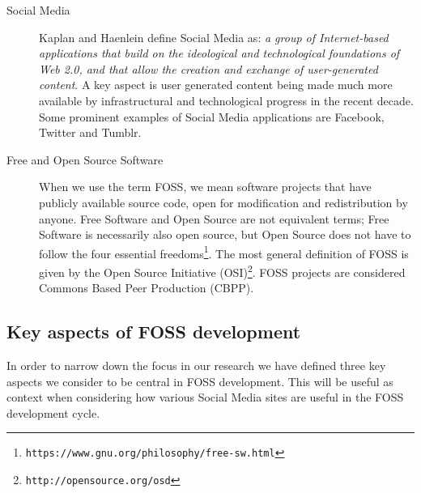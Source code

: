 \documentclass[a4paper,11pt]{article} %
\begin{document}
\begin{description}
\item[Social Media] \hfill
  
  Kaplan and Haenlein define Social Media as: \textit{a group of
    Internet-based applications that build on the ideological and
    technological foundations of Web 2.0, and that allow the creation
    and exchange of user-generated content}\cite{Kaplan201059}. A key
  aspect is user generated content being made much more available by
  infrastructural and technological progress in the recent
  decade. Some prominent examples of Social Media applications are
  Facebook, Twitter and Tumblr.

\item[Free and Open Source Software] \hfill

  When we use the term FOSS, we mean software projects that have publicly
  available source code, open for modification and redistribution by
  anyone\cite[p.~18, p.~57]{leister2014opensource}. Free Software and Open
  Source are not equivalent terms; Free Software is necessarily also open
  source, but Open Source does not have to follow the four essential
  freedoms\footnote{\texttt{https://www.gnu.org/philosophy/free-sw.html}}. The
  most general definition of FOSS is given by the Open Source Initiative
  (OSI)\footnote{\texttt{http://opensource.org/osd}}. FOSS projects
  are considered Commons Based Peer Production (CBPP).

\end{description}

\subsection{Key aspects of FOSS development}

In order to narrow down the focus in our research we have defined three key aspects
we consider to be central in FOSS development. This will be useful as context
when considering how various Social Media sites are useful in the FOSS development cycle.
\end{document}
